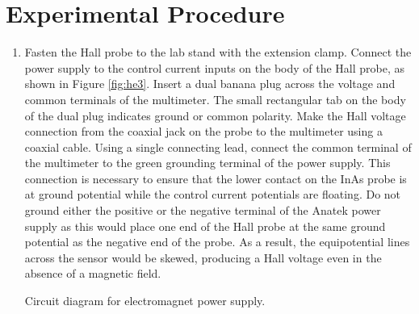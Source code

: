 \section{Experimental Procedure}
\begin{enumerate}

\item Fasten the Hall probe to the lab stand with the extension clamp. Connect the power supply to the control current inputs on the body of the Hall probe, as shown in Figure \ref{fig:he3}. Insert a dual banana plug across the voltage and common terminals of the multimeter. The small rectangular tab on the body of the dual plug indicates ground or common polarity. Make the Hall voltage connection from the coaxial jack on the probe to the multimeter using a coaxial cable. Using a single connecting lead, connect the common terminal of the multimeter to the green grounding terminal of the power supply. This connection is necessary to ensure that the lower contact on the InAs probe is at ground potential while the control current potentials are floating. Do not ground either the positive or the negative terminal of the Anatek power supply as this would place one end of the Hall probe at the same ground potential as the negative end of the probe. As a result, the equipotential lines across the sensor would be skewed, producing a Hall voltage even in the absence of a magnetic field. 

\begin{marginfigure}
\caption{Circuit diagram for electromagnet power supply.}
\label{fig:he5}
\end{marginfigure}


\end{enumerate}
